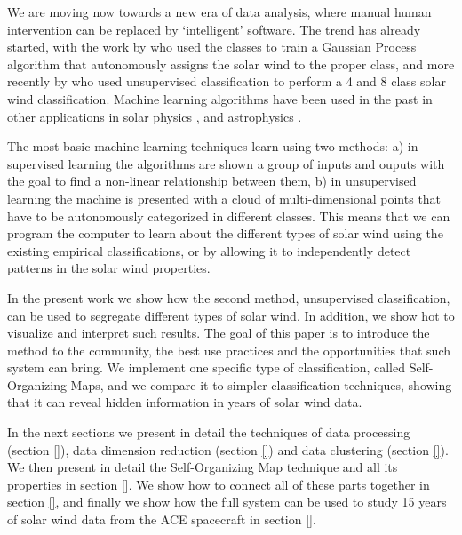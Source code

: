 We are moving now towards a new era of data analysis, where manual human intervention can be replaced by `intelligent' software. The trend has already started, with the work by \citep{Camporeale2017b} who used the \citep{Xu2015b} classes to train a Gaussian Process algorithm that autonomously assigns the solar wind to the proper class, and more recently by \citep{Roberts2020} who used unsupervised classification to perform a 4 and 8 class solar wind classification. Machine learning algorithms have been used in the past in other applications in solar physics \citep{Lundstedt1996,Qahwaji2008c,Ahmed2013c,Bobra2015,Bobra2016,Nishizuka2017c,Camporeale2018}, and astrophysics \citep{VanderPlas2012,Ntampaka2015,Hajian2015,Suveges2017,Bai2018,Bonjean2019}.

The most basic machine learning techniques learn using two methods: a) in supervised learning the algorithms are shown a group of inputs and ouputs with the goal to find a non-linear relationship between them, b) in unsupervised learning the machine is presented with a cloud of multi-dimensional points that have to be autonomously categorized in different classes. This means that we can program the computer to learn about the different types of solar wind using the existing empirical classifications, or by allowing it to independently detect patterns in the solar wind properties.

In the present work we show how the second method, unsupervised classification, can be used to segregate different types of solar wind. In addition, we show hot to visualize and interpret such results. The goal of this paper is to introduce the method to the community, the best use practices and the opportunities that such system can bring. We implement one specific type of classification, called Self-Organizing Maps, and we compare it to simpler classification techniques, showing that it can reveal hidden information in years of solar wind data.

In the next sections we present in detail the techniques of data processing (section \ref{}), data dimension reduction (section \ref{}) and data clustering (section \ref{}). We then present in detail the Self-Organizing Map technique and all its properties in section \ref{}. We show how to connect all of these parts together in section \ref{}, and finally we show how the full system can be used to study 15 years of solar wind data from the ACE spacecraft in section \ref{}.


 

